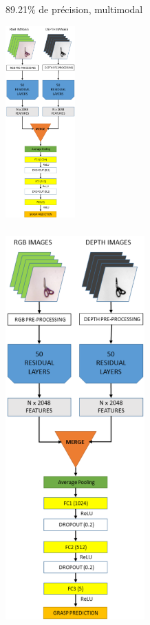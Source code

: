 \documentclass{beamer}
\begin{document}
\begin{frame}
  \frametitle{\cite{Kumra2016}}
  89.21\% de précision, multimodal
  \begin{center}
  \includegraphics[width=0.2\textwidth]{img/resnet_grasp.png}
  \end{center}
\end{frame}

\begin{frame}
  \frametitle{\cite{Kumra2016}}
  \begin{center}
  \includegraphics[width=0.4\textwidth]{img/resnet_grasp.png}
  \end{center}
\end{frame}
\end{document}
